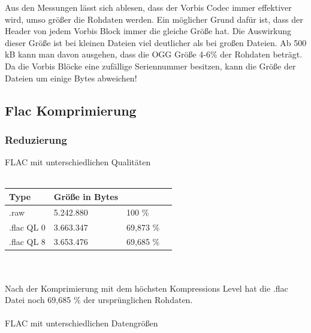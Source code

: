 \documentclass{article}
\begin{document}
	Aus den Messungen lässt sich ablesen, dass der Vorbis Codec immer effektiver wird, umso größer die Rohdaten werden. Ein möglicher Grund dafür ist, dass der Header von jedem Vorbis Block immer die gleiche Größe hat. Die Auswirkung dieser Größe ist bei kleinen Dateien viel deutlicher als bei großen Dateien.
	Ab 500 kB kann man davon ausgehen, dass die OGG Größe 4-6\% der Rohdaten beträgt.
	Da die Vorbis Blöcke eine zufällige Seriennummer besitzen, kann die Größe der Dateien um einige Bytes abweichen!
		
\newpage			
	\subsection{Flac Komprimierung}	
		\subsubsection{Reduzierung}
		FLAC mit unterschiedlichen Qualitäten\\\\
		
		\begin{tabularx}{\textwidth}{p{}|l|l|l}
			Type 			& Größe in Bytes 		&  \\
			\hline
			.raw			& 5.242.880				& 100 \%		\\
			\hline
			\hline
			.flac QL 0		& 3.663.347				& 69,873 \%\\
			\hline
			.flac QL  8		& 3.653.476				& 69,685 \%	\\
			
		\end{tabularx}
	\\\\
	Nach der Komprimierung mit dem höchsten Kompressions Level hat die .flac Datei noch 69,685 \% der ursprünglichen Rohdaten.\\\\
	FLAC mit unterschiedlichen Datengrößen
	
\end{document}
